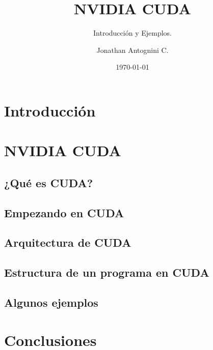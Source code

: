 \documentclass{beamer}
\title{NVIDIA CUDA}
\subtitle{Introducción y Ejemplos.}
\author{Jonathan Antognini C.}
\institute[]{Universidad Técnica Federico Santa María}
\date{\today}
\begin{document}
    \frame{\titlepage}
    \frame{\tableofcontents}
	\section{Introducción}								%
	\section{NVIDIA CUDA}								%
		\subsection{¿Qué es CUDA?}						%
		\subsection{Empezando en CUDA}						%
		\subsection{Arquitectura de CUDA}					%
		\subsection{Estructura de un programa en CUDA}				%
		\subsection{Algunos ejemplos}						%
	\section{Conclusiones}								%
	
\end{document}
